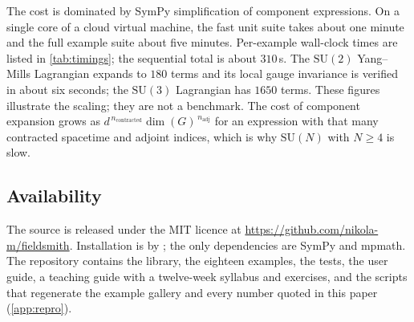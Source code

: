 The cost is dominated by SymPy simplification of component expressions. On a single core of a cloud virtual machine, the fast unit suite takes about one minute and the full example suite about five minutes. Per-example wall-clock times are listed in \cref{tab:timings}; the sequential total is about $310$\,s. The $\mathrm{SU}(2)$ Yang--Mills Lagrangian expands to $180$ terms and its local gauge invariance is verified in about six seconds; the $\mathrm{SU}(3)$ Lagrangian has $1650$ terms. These figures illustrate the scaling; they are not a benchmark. The cost of component expansion grows as $d^{\,n_{\text{contracted}}}\dim(G)^{\,n_{\text{adj}}}$ for an expression with that many contracted spacetime and adjoint indices, which is why $\mathrm{SU}(N)$ with $N\ge4$ is slow.

\subsection{Availability}
\label{sec:avail}

The source is released under the MIT licence at \url{https://github.com/nikola-m/fieldsmith}. Installation is by ; the only dependencies are SymPy and mpmath. The repository contains the library, the eighteen examples, the tests, the user guide, a teaching guide with a twelve-week syllabus and exercises, and the scripts that regenerate the example gallery and every number quoted in this paper (\cref{app:repro}).
